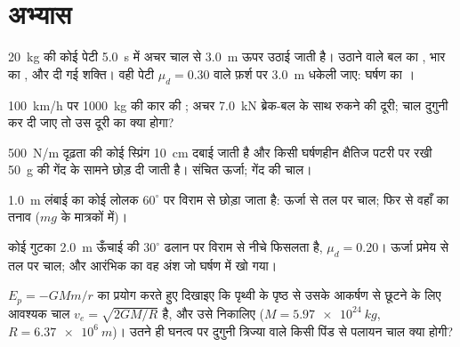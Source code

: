 \section{अभ्यास}

\begin{exercise}[$\star$]\label{exo:b1:work-and-energy:1}
\qty{20}{kg} की कोई पेटी \qty{5.0}{s} में अचर चाल से \qty{3.0}{m} ऊपर
उठाई जाती है। उठाने वाले बल का , भार का , और दी गई शक्ति। वही
पेटी $\mu_d = 0.30$ वाले फ़र्श पर \qty{3.0}{m} धकेली जाए: घर्षण का ।
\end{exercise}

\begin{exercise}[$\star$]\label{exo:b1:work-and-energy:2}
\qty{100}{km/h} पर \qty{1000}{kg} की कार की ; अचर \qty{7.0}{kN}
ब्रेक-बल के साथ रुकने की दूरी; चाल दुगुनी कर दी जाए तो उस दूरी का क्या
होगा?
\end{exercise}

\begin{exercise}[$\star$]\label{exo:b1:work-and-energy:3}
\qty{500}{N/m} दृढ़ता की कोई स्प्रिंग \qty{10}{cm} दबाई जाती है और किसी
घर्षणहीन क्षैतिज पटरी पर रखी \qty{50}{g} की गेंद के सामने छोड़ दी जाती है।
संचित ऊर्जा; गेंद की चाल।
\end{exercise}

\begin{exercise}[$\star$]\label{exo:b1:work-and-energy:4}
\qty{1.0}{m} लंबाई का कोई लोलक $60^\circ$ पर विराम से छोड़ा जाता है: ऊर्जा
से तल पर चाल; फिर  से वहाँ का तनाव ($mg$ के मात्रकों में)।
\end{exercise}

\begin{exercise}[$\star\star$]\label{exo:b1:work-and-energy:5}
कोई गुटका \qty{2.0}{m} ऊँचाई की $30^\circ$ ढलान पर विराम से नीचे फिसलता
है, $\mu_d = 0.20$। ऊर्जा प्रमेय से तल पर चाल; और आरंभिक  का
वह अंश जो घर्षण में खो गया।
\end{exercise}

\begin{exercise}[$\star\star$]\label{exo:b1:work-and-energy:6}
$E_p = -GMm/r$ का प्रयोग करते हुए दिखाइए कि पृथ्वी के पृष्ठ से उसके आकर्षण
से छूटने के लिए आवश्यक चाल $v_e = \sqrt{2GM/R}$ है, और उसे निकालिए
($M = \qty{5.97e24}{kg}$, $R = \qty{6.37e6}{m}$)। उतने ही घनत्व पर दुगुनी
त्रिज्या वाले किसी पिंड से पलायन चाल क्या होगी?
\end{exercise}

